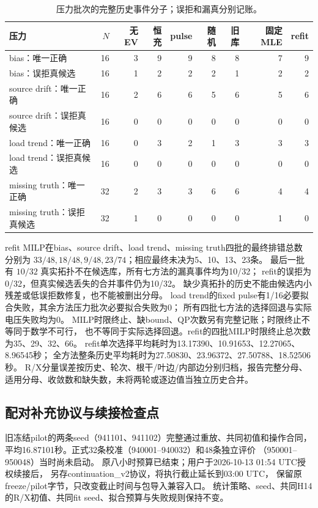 \begin{table}[htbp]
\centering\small
\begin{tabular}{lrrrrrrrr}
\hline
压力 & $N$ & 无EV & 恒充 & pulse & 随机 & 旧库 & 固定MLE & refit\\
\hline
bias：唯一正确 &16&3&9&9&8&8&7&9\\
bias：误拒真候选&16&1&2&2&2&1&2&2\\
source drift：唯一正确&16&2&6&6&5&6&5&6\\
source drift：误拒真候选&16&0&0&0&0&0&0&0\\
load trend：唯一正确&16&0&3&2&1&3&3&3\\
load trend：误拒真候选&16&0&0&0&0&0&0&0\\
missing truth：唯一正确&32&2&3&3&6&6&4&4\\
missing truth：误拒真候选&32&1&0&0&0&0&1&0\\
\hline
\end{tabular}
\caption{压力批次的完整历史事件分子；误拒和漏真分别记账。}
\end{table}

refit MILP在bias、source drift、load trend、missing truth四批的最终排错总数
分别为 $33/48,18/48,9/48,23/74$；相应最终未决为5、10、13、23条。
最后一批有 $10/32$ 真实拓扑不在候选库，所有七方法的漏真事件均为10/32；
refit的误拒为0/32，但真实候选丢失的合并事件仍为10/32。
缺少真拓扑的历史不能由候选内小残差或低误拒数修复，也不能被删出分母。
load trend的fixed pulse有1/16必要拟合失败，其余方法压力批次必要拟合失败为0；
所有四批七方法的选择回退与实际电压失败均为0。
MILP时限终止、缺bound、QP次数另有完整记账；时限终止不等同于数学不可行，
也不等同于实际选择回退。refit的四批MILP时限终止总次数为35、29、32、66。
refit单次选择平均耗时为13.17390、10.91653、12.27065、8.96545秒；
全方法整条历史平均耗时为27.50830、23.96372、27.50788、18.52506秒。
R/X分量误差按历史、轮次、根干/叶边/内部边分别归档，报告完整分母、
适用分母、收敛数和缺失数，未将两轮或逐边值当独立历史合并。

\subsection{配对补充协议与续接检查点}
\label{sec:paired-D-checkpoint}
旧冻结pilot的两条seed（941101、941102）完整通过重放、共同初值和操作合同，
平均16.87101秒。正式32条校准（940001--940032）和48条独立评价
（950001--950048）当时尚未启动。
原八小时预算已结束；用户于2026-10-13 01:54 UTC授权续接后，
另存continuation\_v2协议，将执行截止延长到03:00 UTC，
保留原freeze/pilot字节，只改变截止时间与包导入兼容入口。
统计策略、seed、共同H14的R/X初值、共同fit seed、拟合预算与失败规则保持不变。

